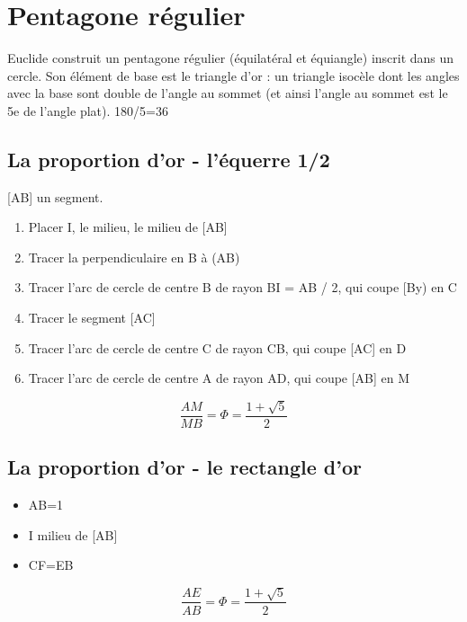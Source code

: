 \documentclass[]{scrartcl}
\begin{document}
\section{Pentagone régulier}   
Euclide construit un pentagone régulier (équilatéral et équiangle) inscrit dans un cercle. Son élément de base est le triangle d'or : un triangle isocèle dont les angles avec la base sont double de l'angle au sommet (et ainsi l'angle au sommet est le 5e de l'angle plat). 180/5=36

\subsection{La proportion d'or - l'équerre 1/2 }
[AB] un segment.

\begin{enumerate}
 
\item Placer I, le milieu, le milieu de [AB]  
\item Tracer la perpendiculaire en B à (AB)
\item Tracer l'arc de cercle de centre B de rayon BI = AB / 2, qui coupe [By) en C  
\item Tracer le segment [AC] 	  
\item Tracer l'arc de cercle de centre C de rayon CB, qui coupe [AC] en D   
\item Tracer l'arc de cercle de centre A de rayon AD, qui coupe [AB] en M 
\end{enumerate}

\[
   \frac{AM}{MB}=\Phi=\frac{1+\sqrt{5}}{2}
\]



\newpage
\subsection{La proportion d'or - le rectangle d'or}

\begin{itemize}
   \item AB=1
   \item I milieu de [AB]
   \item CF=EB
\end{itemize}
\[
   \frac{AE}{AB}=\Phi=\frac{1+\sqrt{5}}{2}
\]
\end{document}
